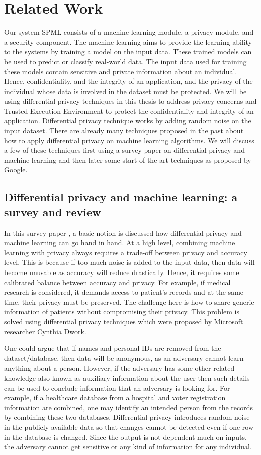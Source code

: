 \chapter{Related Work}
\label{sec:related_work}
Our system SPML consists of a machine learning module, a privacy module, and a security component. The machine learning aims to provide the learning ability to the systems by training a model on the input data. These trained models can be used to predict or classify real-world data. The input data used for training these models contain sensitive and private information about an individual. Hence, confidentiality, and the integrity of an application, and the privacy of the individual whose data is involved in the dataset must be protected. We will be using differential privacy techniques \cite{3} in this thesis to address privacy concerns and Trusted Execution Environment to protect the confidentiality and integrity of an application. Differential privacy technique works by adding random noise on the input dataset. There are already many techniques proposed in the past about how to apply differential privacy on machine learning algorithms. We will discuss a few of these techniques first using a survey paper on differential privacy and machine learning and then later some start-of-the-art techniques as proposed by Google.


\section{Differential privacy and machine learning: a survey and review}
\label{sec:rwDPsurvery}
In this survey paper \cite{6}, a basic notion is discussed how differential privacy and machine learning can go hand in hand. At a high level, combining machine learning with privacy always requires a trade-off between privacy and accuracy level. This is because if too much noise is added to the input data, then data will become unusable as accuracy will reduce drastically. Hence, it requires some calibrated balance between accuracy and privacy. For example, if medical research is considered, it demands access to patient's records and at the same time, their privacy must be preserved. The challenge here is how to share generic information of patients without compromising their privacy. This problem is solved using differential privacy techniques \cite{3} which were proposed by Microsoft researcher Cynthia Dwork.

One could argue that if names and personal IDs are removed from the dataset/database, then data will be anonymous, as an adversary cannot learn anything about a person. However, if the adversary has some other related knowledge also known as auxiliary information about the user then such details can be used to conclude information that an adversary is looking for. For example, if a healthcare database from a hospital and voter registration information are combined, one may identify an intended person from the records by combining these two databases. Differential privacy introduces random noise in the publicly available data so that changes cannot be detected even if one row in the database is changed. Since the output is not dependent much on inputs, the adversary cannot get sensitive or any kind of information for any individual.

